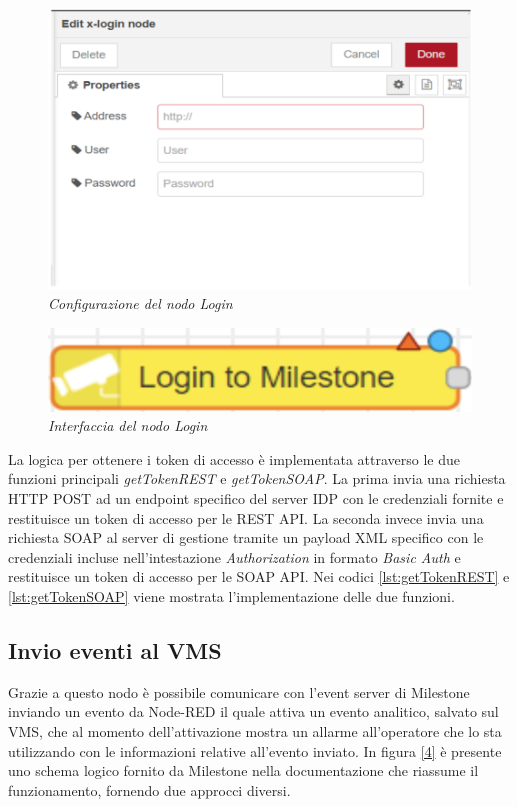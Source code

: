 \documentclass[a4paper, openright, thesis]{report}
\begin{document}
\begin{figure}[H]
    \centering
    \includegraphics[width=0.5\linewidth]{img/2.png}
    \caption{\textit{Configurazione del nodo Login}}
    \label{2}
\end{figure}

\begin{figure}[H]
    \centering
    \includegraphics[width=0.5\linewidth]{img/3.png}
    \caption{\textit{Interfaccia del nodo Login}}
    \label{3}
\end{figure}
\noindent La logica per ottenere i token di accesso è implementata attraverso le due funzioni principali \textit{getTokenREST} e \textit{getTokenSOAP}.
La prima invia una richiesta HTTP POST ad un endpoint specifico del server IDP con le credenziali fornite e restituisce un token di accesso per le REST API.
La seconda invece invia una richiesta SOAP al server di gestione tramite un payload XML specifico con le credenziali incluse nell'intestazione \textit{Authorization} in formato \textit{Basic Auth} e restituisce un token di accesso per le SOAP API.
Nei codici \ref{lst:getTokenREST} e \ref{lst:getTokenSOAP} viene mostrata l'implementazione delle due funzioni.
\begin{figure}[H]
    \centering
    
    \vspace{1em}
    
\end{figure}



\subsection{Invio eventi al VMS}\label{sendevent}
Grazie a questo nodo è possibile comunicare con l’event server di Milestone inviando un evento da Node-RED il quale attiva un evento analitico, salvato sul VMS, che al momento dell’attivazione mostra un allarme all’operatore che lo sta
utilizzando con le informazioni relative all’evento inviato. In figura \ref{4} è presente uno
schema logico fornito da Milestone nella documentazione \cite{eventdoc} che riassume il funzionamento, fornendo due approcci diversi.
\end{document}
